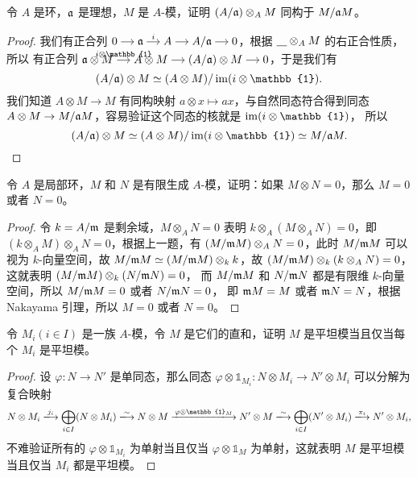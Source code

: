 \begin{problem}\label{prob:isomorphism of tensor}
  令 $A$ 是环，$\mathfrak{a}$ 是理想，$M$ 是 $A$-模，证明 $(A/\mathfrak{a})\otimes_A M$ 同构于
  $M/\mathfrak{a}M$。
\end{problem}
\begin{proof}
  我们有正合列
  $
    \begin{tikzcd}[cramped,column sep=small]
      0\arrow[r] &\ideal a\arrow[r,"i"] & A\arrow[r] & A/\ideal a\arrow[r] & 0
    \end{tikzcd}
  $，根据 $\uline\otimes_A M$ 的右正合性质，所以
  有正合列
  $
    \begin{tikzcd}[cramped,column sep=small]
      \ideal a\otimes M\arrow[r,"i\otimes\mathbb{1}"] & A\otimes M\arrow[r] & (A/\ideal a)\otimes M\arrow[r] & 0
    \end{tikzcd}
  $，于是我们有
  \[
    (A/\ideal a)\otimes M\simeq (A\otimes M)/\im(i\otimes\mathbb{1}).  
  \]
  我们知道 $A\otimes M\to M$ 有同构映射 $a\otimes x\mapsto ax$，与自然同态符合得到同态
  $A\otimes M\to M/\mathfrak{a}M$，容易验证这个同态的核就是 $\im(i\otimes\mathbb{1})$，
  所以 
  \[
    (A/\ideal a)\otimes M\simeq (A\otimes M)/\im(i\otimes\mathbb{1})
    \simeq M/\ideal aM.\qedhere
  \]
\end{proof}

\begin{problem}
  令 $A$ 是局部环，$M$ 和 $N$ 是有限生成 $A$-模，证明：如果 $M\otimes N=0$，那么
  $M=0$ 或者 $N=0$。
\end{problem}
\begin{proof}
  令 $k=A/\mathfrak{m}$ 是剩余域，$M\otimes_A N=0$ 表明 $k\otimes_A(M\otimes_A N)=0$，即
  $(k\otimes_A M)\otimes_AN=0$，根据上一题，有 $(M/\mathfrak{m}M)\otimes_A N=0$，此时
  $M/\mathfrak{m}M$ 可以视为 $k$-向量空间，故 $M/\mathfrak{m}M\simeq (M/\mathfrak{m}M)\otimes_k k$，故
  $(M/\mathfrak{m}M)\otimes_k (k\otimes_AN)=0$，这就表明 $(M/\mathfrak{m}M)\otimes_k (N/\mathfrak{m}N)=0$，
  而 $M/\mathfrak{m}M$ 和 $N/\mathfrak{m}N$ 都是有限维 $k$-向量空间，所以 $M/\mathfrak{m}M=0$ 或者 $N/\mathfrak{m}N=0$，
  即 $\mathfrak{m}M=M$ 或者 $\mathfrak{m}N=N$，根据 Nakayama 引理，所以 $M=0$ 或者 $N=0$。 
\end{proof}

\begin{problem}
  令 $M_i(i\in I)$ 是一族 $A$-模，令 $M$ 是它们的直和，证明 $M$ 是平坦模当且仅当每个
  $M_i$ 是平坦模。
\end{problem}
\begin{proof}
  设 $\varphi:N\to N'$ 是单同态，那么同态 $\varphi\otimes \mathbb{1}_{M_i}:N\otimes M_i\to N'\otimes M_i$
  可以分解为复合映射
  \[
    N\otimes M_i\xlongrightarrow{j_i}\bigoplus_{i\in I}(N\otimes M_i)
    \xlongrightarrow{\sim} N\otimes M\xlongrightarrow{\varphi\otimes\mathbb{1}_{M}}
    N'\otimes M\xlongrightarrow{\sim}
    \bigoplus_{i\in I}(N'\otimes M_i)\xlongrightarrow{\pi_i}N'\otimes M_i,
  \]
  不难验证所有的 $\varphi\otimes\mathbb{1}_{M_i}$ 为单射当且仅当 $\varphi\otimes \mathbb{1}_M$
  为单射，这就表明 $M$ 是平坦模当且仅当 $M_i$ 都是平坦模。
\end{proof}

